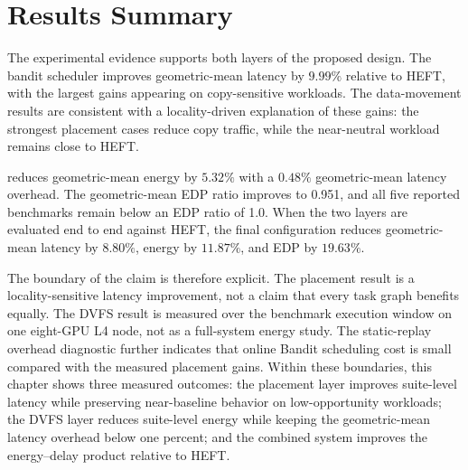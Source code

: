 \section{Results Summary}
\label{sec:results-summary}

The experimental evidence supports both layers of the proposed design. The
bandit scheduler improves geometric-mean latency by \(9.99\%\) relative
to HEFT, with the largest gains appearing on copy-sensitive workloads. The
data-movement results are consistent with a locality-driven explanation of
these gains: the strongest placement cases reduce copy traffic, while the
near-neutral workload remains close to HEFT.

\WinDVFS{} reduces geometric-mean energy by \(5.32\%\) with a \(0.48\%\)
geometric-mean latency overhead. The geometric-mean EDP ratio improves to
0.951, and all five reported benchmarks remain below an EDP ratio of 1.0.
When the two layers are evaluated end to end against HEFT, the final
\BanditWinDVFS{} configuration reduces geometric-mean latency by \(8.80\%\),
energy by \(11.87\%\), and EDP by \(19.63\%\).

The boundary of the claim is therefore explicit. The placement result is a
locality-sensitive latency improvement, not a claim that every task graph
benefits equally. The DVFS result is measured over the benchmark execution
window on one eight-GPU L4 node, not as a full-system energy study. The
static-replay overhead diagnostic further indicates that online Bandit
scheduling cost is small compared with the measured placement gains. Within
these boundaries, this chapter shows three measured outcomes: the placement
layer improves suite-level latency while preserving near-baseline behavior on
low-opportunity workloads; the DVFS layer reduces suite-level energy while
keeping the geometric-mean latency overhead below one percent; and the combined
system improves the energy--delay product relative to HEFT.
